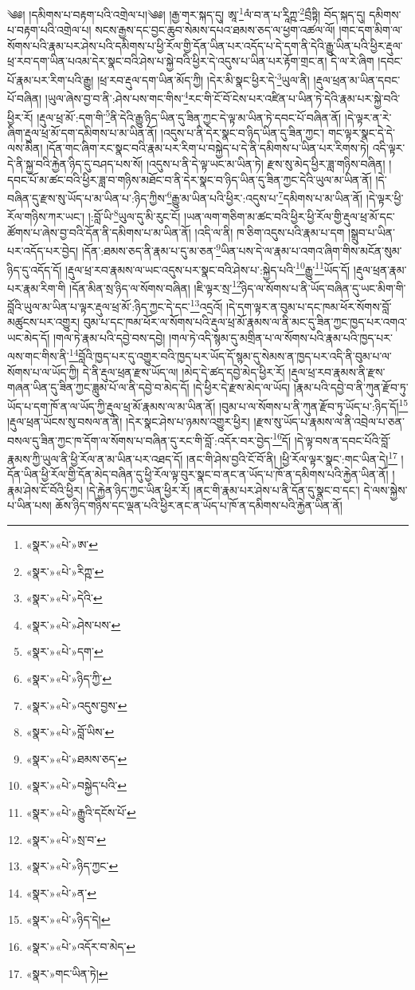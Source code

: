 ༄༅། །དམིགས་པ་བརྟག་པའི་འགྲེལ་པ།༄༅། །རྒྱ་གར་སྐད་དུ། ཨཱ་\footnote{«སྣར་»«པེ་»ཨ་}ལཾ་བ་ན་པ་རཱིཀྵ་\footnote{«སྣར་»«པེ་»རིཀྵ་}བྲྀཏྟི། བོད་སྐད་དུ། དམིགས་པ་བརྟག་པའི་འགྲེལ་པ། སངས་རྒྱས་དང་བྱང་ཆུབ་སེམས་དཔའ་ཐམས་ཅད་ལ་ཕྱག་འཚལ་ལོ། །གང་དག་མིག་ལ་སོགས་པའི་རྣམ་པར་ཤེས་པའི་དམིགས་པ་ཕྱི་རོལ་གྱི་དོན་ཡིན་པར་འདོད་པ་དེ་དག་ནི་དེའི་རྒྱུ་ཡིན་པའི་ཕྱིར་རྡུལ་ཕྲ་རབ་དག་ཡིན་པའམ་དེར་སྣང་བའི་ཤེས་པ་སྐྱེ་བའི་ཕྱིར་དེ་འདུས་པ་ཡིན་པར་རྟོག་གྲང་ན། དེ་ལ་རེ་ཞིག །དབང་པོ་རྣམ་པར་རིག་པའི་རྒྱུ། །ཕྲ་རབ་རྡུལ་དག་ཡིན་མོད་ཀྱི། །དེར་མི་སྣང་ཕྱིར་དེ་\footnote{«སྣར་»«པེ་»དེའི་}ཡུལ་ནི། །རྡུལ་ཕྲན་མ་ཡིན་དབང་པོ་བཞིན། །ཡུལ་ཞེས་བྱ་བ་ནི་:ཤེས་པས་གང་གིས་\footnote{«སྣར་»«པེ་»ཤེས་པས་}རང་གི་ངོ་བོ་ངེས་པར་འཛིན་པ་ཡིན་ཏེ་དེའི་རྣམ་པར་སྐྱེ་བའི་ཕྱིར་རོ། །རྡུལ་ཕྲ་མོ་:དག་གི་\footnote{«སྣར་»«པེ་»དག་}ནི་དེའི་རྒྱུ་ཉིད་ཡིན་དུ་ཟིན་ཀྱང་དེ་ལྟ་མ་ཡིན་ཏེ་དབང་པོ་བཞིན་ནོ། །དེ་ལྟར་ན་རེ་ཞིག་རྡུལ་ཕྲ་མོ་དག་དམིགས་པ་མ་ཡིན་ནོ། །འདུས་པ་ནི་དེར་སྣང་བ་ཉིད་ཡིན་དུ་ཟིན་ཀྱང་། གང་ལྟར་སྣང་དེ་དེ་ལས་མིན། །དོན་གང་ཞིག་རང་སྣང་བའི་རྣམ་པར་རིག་པ་བསྐྱེད་པ་དེ་ནི་དམིགས་པ་ཡིན་པར་རིགས་ཏེ། འདི་ལྟར་དེ་ནི་སྐྱ་བའི་རྐྱེན་ཉིད་དུ་བཤད་པས་སོ། །འདུས་པ་ནི་དེ་ལྟ་ཡང་མ་ཡིན་ཏེ། རྫས་སུ་མེད་ཕྱིར་ཟླ་གཉིས་བཞིན། །དབང་པོ་མ་ཚང་བའི་ཕྱིར་ཟླ་བ་གཉིས་མཐོང་བ་ནི་དེར་སྣང་བ་ཉིད་ཡིན་དུ་ཟིན་ཀྱང་དེའི་ཡུལ་མ་ཡིན་ནོ། །དེ་བཞིན་དུ་རྫས་སུ་ཡོད་པ་མ་ཡིན་པ་:ཉིད་ཀྱིས་\footnote{«སྣར་»«པེ་»ཉིད་ཀྱི་}རྒྱུ་མ་ཡིན་པའི་ཕྱིར་:འདུས་པ་\footnote{«སྣར་»«པེ་»འདུས་བྱས་}དམིགས་པ་མ་ཡིན་ནོ། །དེ་ལྟར་ཕྱི་རོལ་གཉིས་ཀར་ཡང་། །:བློ་ཡི་\footnote{«སྣར་»«པེ་»བློ་ཡིས་}ཡུལ་དུ་མི་རུང་ངོ། །ཡན་ལག་གཅིག་མ་ཚང་བའི་ཕྱིར་ཕྱི་རོལ་གྱི་རྡུལ་ཕྲ་མོ་དང་ཚོགས་པ་ཞེས་བྱ་བའི་དོན་ནི་དམིགས་པ་མ་ཡིན་ནོ། །འདི་ལ་ནི། ཁ་ཅིག་འདུས་པའི་རྣམ་པ་དག །སྒྲུབ་པ་ཡིན་པར་འདོད་པར་བྱེད། །དོན་:ཐམས་ཅད་ནི་རྣམ་པ་དུ་མ་ཅན་\footnote{«སྣར་»«པེ་»ཐམས་ཅད་}ཡིན་པས་དེ་ལ་རྣམ་པ་འགའ་ཞིག་གིས་མངོན་སུམ་ཉིད་དུ་འདོད་དོ། །རྡུལ་ཕྲ་རབ་རྣམས་ལ་ཡང་འདུས་པར་སྣང་བའི་ཤེས་པ་:སྐྱེད་པའི་\footnote{«སྣར་»«པེ་»བསྐྱེད་པའི་}རྒྱུ་\footnote{«སྣར་»«པེ་»རྒྱུའི་དངོས་པོ་}ཡོད་དོ། །རྡུལ་ཕྲན་རྣམ་པར་རྣམ་རིག་གི །དོན་མིན་སྲ་ཉིད་ལ་སོགས་བཞིན། །ཇི་ལྟར་སྲ་\footnote{«སྣར་»«པེ་»སྲ་བ་}ཉིད་ལ་སོགས་པ་ནི་ཡོད་བཞིན་དུ་ཡང་མིག་གི་བློའི་ཡུལ་མ་ཡིན་པ་ལྟར་རྡུལ་ཕྲ་མོ་:ཉིད་ཀྱང་དེ་དང་\footnote{«སྣར་»«པེ་»ཉིད་ཀྱང་}འདྲའོ། །དེ་དག་ལྟར་ན་བུམ་པ་དང་ཁམ་ཕོར་སོགས་བློ་མཚུངས་པར་འགྱུར། བུམ་པ་དང་ཁམ་ཕོར་ལ་སོགས་པའི་རྡུལ་ཕྲ་མོ་རྣམས་ལ་ནི་མང་དུ་ཟིན་ཀྱང་ཁྱད་པར་འགའ་ཡང་མེད་དོ། །གལ་ཏེ་རྣམ་པའི་དབྱེ་བས་དབྱེ། །གལ་ཏེ་འདི་སྙམ་དུ་མགྲིན་པ་ལ་སོགས་པའི་རྣམ་པའི་ཁྱད་པར་ལས་གང་གིས་ནི་\footnote{«སྣར་»«པེ་»ན་}བློའི་ཁྱད་པར་དུ་འགྱུར་བའི་ཁྱད་པར་ཡོད་དོ་སྙམ་དུ་སེམས་ན་ཁྱད་པར་འདི་ནི་བུམ་པ་ལ་སོགས་པ་ལ་ཡོད་ཀྱི། དེ་ནི་རྡུལ་ཕྲན་རྫས་ཡོད་ལ། །མེད་དེ་ཚད་དབྱེ་མེད་ཕྱིར་རོ། །རྡུལ་ཕྲ་རབ་རྣམས་ནི་རྫས་གཞན་ཡིན་དུ་ཟིན་ཀྱང་ཟླུམ་པོ་ལ་ནི་དབྱེ་བ་མེད་དོ། །དེ་ཕྱིར་དེ་རྫས་མེད་ལ་ཡོད། །རྣམ་པའི་དབྱེ་བ་ནི་ཀུན་རྫོབ་ཏུ་ཡོད་པ་དག་ཁོ་ན་ལ་ཡོད་ཀྱི་རྡུལ་ཕྲ་མོ་རྣམས་ལ་མ་ཡིན་ནོ། །བུམ་པ་ལ་སོགས་པ་ནི་ཀུན་རྫོབ་ཏུ་ཡོད་པ་:ཉིད་དོ།\footnote{«སྣར་»«པེ་»ཉིད་དེ།} །རྡུལ་ཕྲན་ཡོངས་སུ་བསལ་ན་ནི། །དེར་སྣང་ཤེས་པ་ཉམས་འགྱུར་ཕྱིར། །རྫས་སུ་ཡོད་པ་རྣམས་ལ་ནི་འབྲེལ་པ་ཅན་བསལ་དུ་ཟིན་ཀྱང་ཁ་དོག་ལ་སོགས་པ་བཞིན་དུ་རང་གི་བློ་:འདོར་བར་བྱེད་\footnote{«སྣར་»«པེ་»འདོར་བ་མེད་}དོ། །དེ་ལྟ་བས་ན་དབང་པོའི་བློ་རྣམས་ཀྱི་ཡུལ་ནི་ཕྱི་རོལ་ན་མ་ཡིན་པར་འཐད་དོ། །ནང་གི་ཤེས་བྱའི་ངོ་བོ་ནི། །ཕྱི་རོལ་ལྟར་སྣང་:གང་ཡིན་དེ།\footnote{«སྣར་»གང་ཡིན་ཏེ།} །དོན་ཡིན་ཕྱི་རོལ་གྱི་དོན་མེད་བཞིན་དུ་ཕྱི་རོལ་ལྟ་བུར་སྣང་བ་ནང་ན་ཡོད་པ་ཁོ་ན་དམིགས་པའི་རྐྱེན་ཡིན་ནོ། །རྣམ་ཤེས་ངོ་བོའི་ཕྱིར། །དེ་རྐྱེན་ཉིད་ཀྱང་ཡིན་ཕྱིར་རོ། །ནང་གི་རྣམ་པར་ཤེས་པ་ནི་དོན་དུ་སྣང་བ་དང་། དེ་ལས་སྐྱེས་པ་ཡིན་པས། ཆོས་ཉིད་གཉིས་དང་ལྡན་པའི་ཕྱིར་ནང་ན་ཡོད་པ་ཁོ་ན་དམིགས་པའི་རྐྱེན་ཡིན་ནོ། 